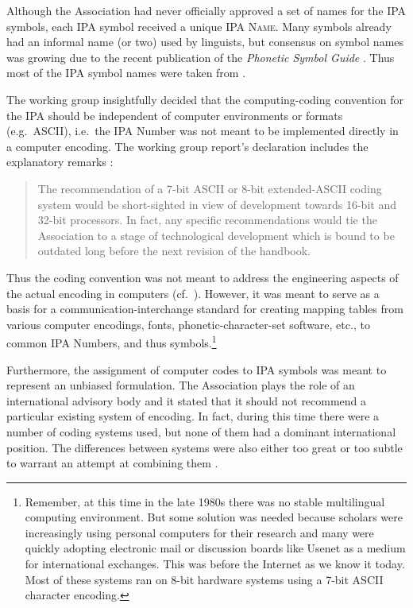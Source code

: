Although the Association had never officially approved a set of names 
for the IPA symbols, each IPA symbol received a unique \textsc{IPA Name}. 
Many symbols already had an informal name (or two) used by linguists, but 
consensus on symbol names was growing due to the recent publication of the 
\textit{Phonetic Symbol Guide} \citep{PullumLadusaw1986}. Thus most of the 
IPA symbol names were taken from \cite{PullumLadusaw1986} \citep[31]{IPA1999}.

The working group insightfully decided that the computing-coding convention 
for the IPA should be independent of computer environments or formats (e.g.\ ASCII), 
i.e.\ the IPA Number was not meant to be implemented directly in a computer 
encoding. The working group report's declaration includes the explanatory 
remarks \citep[82]{International1989report}:

\begin{quote}
The recommendation of a 7-bit ASCII or 8-bit extended-ASCII coding system 
would be short-sighted in view of development towards 16-bit and 32-bit 
processors. In fact, any specific recommendations would tie the Association 
to a stage of technological development which is bound to be outdated long 
before the next revision of the handbook.
\end{quote}

\noindent Thus the coding convention was not meant to address the engineering 
aspects of the actual encoding in computers (cf.\ \cite{Anderson1984}). However, 
it was meant to serve as a basis for a communication-interchange standard for 
creating mapping tables from various computer encodings, fonts, phonetic-character-set 
software, etc., to common IPA Numbers, and thus symbols.\footnote{Remember, at 
this time in the late 1980s there was no stable multilingual computing environment. 
But some solution was needed because scholars were increasingly using personal 
computers for their research and many were quickly adopting electronic mail or 
discussion boards like Usenet as a medium for international exchanges. This was 
before the Internet as we know it today. Most of these systems ran on 8-bit 
hardware systems using a 7-bit ASCII character encoding.}

Furthermore, the assignment of computer codes to IPA symbols was meant to 
represent an unbiased formulation. The Association plays the role of an international 
advisory body and it stated that it should not recommend a particular existing 
system of encoding. In fact, during this time there were a number of coding 
systems used, but none of them had a dominant international position. The 
differences between systems were also either too great or too subtle to warrant 
an attempt at combining them \citep{International1989report}.

